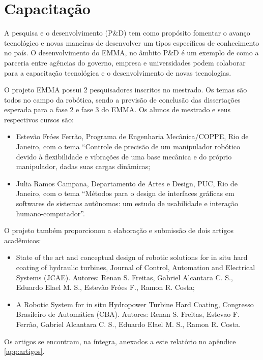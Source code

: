 \section{Capacitação}

A pesquisa e o desenvolvimento (P\&D) tem como propósito fomentar o avanço
tecnológico e novas maneiras de desenvolver um tipos específicos de conhecimento
no país. O desenvolvimento do EMMA, no âmbito P\&D é um exemplo de como a
parceria entre agências do governo, empresa e universidades podem colaborar para
a capacitação tecnológica e o desenvolvimento de novas tecnologias.

O projeto EMMA possui 2 pesquisadores inscritos no mestrado. Os temas são todos
no campo da robótica, sendo a previsão de conclusão das dissertações
esperada para a fase 2 e fase 3 do EMMA. Os alunos de mestrado e seus
respectivos cursos são:

\begin{itemize}
  \item Estevão Fróes Ferrão, Programa de Engenharia Mecânica/COPPE, Rio de
  Janeiro, com o tema ``Controle de precisão de um manipulador robótico devido à
  flexibilidade e vibrações de uma base mecânica e do próprio manipulador, dadas
  suas cargas dinâmicas;
  \item Julia Ramos Campana, Departamento de Artes e Design, PUC, Rio de
  Janeiro, com o tema ``Métodos para o design de interfaces gráficas em
softwares de sistemas autônomos: um estudo de usabilidade e interação
humano-computador''.
\end{itemize}
O projeto também proporcionou a elaboração e submissão de dois artigos
acadêmicos:

\begin{itemize}
  \item State of the art and conceptual design of robotic solutions for in situ
  hard coating of hydraulic turbines, Journal of Control, Automation and
  Electrical Systems (JCAE). Autores: Renan S. Freitas, Gabriel Alcantara C. S.,
  Eduardo Elael M. S., Estevão Fróes F., Ramon R. Costa;
  \item A Robotic System for in situ Hydropower Turbine Hard Coating, Congresso
  Brasileiro de Automática (CBA). Autores: Renan S. Freitas, Estevao F. Ferrão,
  Gabriel Alcantara C. S., Eduardo Elael M. S., Ramon R. Costa.
\end{itemize}

Os artigos se encontram, na íntegra, anexados a este relatório no apêndice
\ref{app:artigos}.



